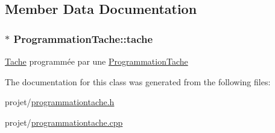 \subsection{Member Data Documentation}
\hypertarget{class_programmation_tache_a107df0f6b1dca79ca0b83739d8d177dc}{}
\subsubsection[{tache}]{$\ast$ Programmation\+Tache\+::tache\hspace{0.3cm}{\ttfamily [private]}}\label{class_programmation_tache_a107df0f6b1dca79ca0b83739d8d177dc}
\hyperlink{class_tache}{Tache} programmée par une \hyperlink{class_programmation_tache}{Programmation\+Tache} 

The documentation for this class was generated from the following files\+:\begin{DoxyCompactItemize}
\item 
projet/\hyperlink{programmationtache_8h}{programmationtache.\+h}\item 
projet/\hyperlink{programmationtache_8cpp}{programmationtache.\+cpp}\end{DoxyCompactItemize}
